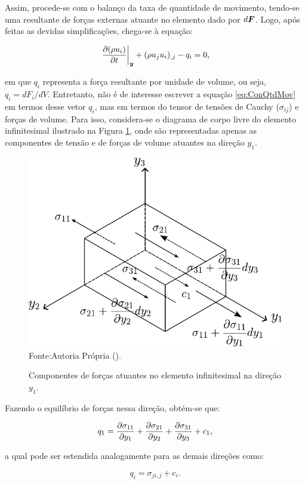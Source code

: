 Assim, procede-se com o balanço da taxa de quantidade de movimento, tendo-se uma resultante de forças externas atuante no elemento dado por $d\boldsymbol{F}$. Logo, após feitas as devidas simplificações, chega-se à equação:

\begin{equation}
    \left.\frac{\partial{(\rho u_i)}}{\partial{t}}\right|_{\boldsymbol{y}}+(\rho u_ju_i)_{,j}-q_i=0\text{,}
    \label{eq:ConQtdMov}
\end{equation}

\noindent em que $q_i$ representa a força resultante por unidade de volume, ou seja, $q_i=dF_i/dV$. Entretanto, não é de interesse escrever a equação \ref{eq:ConQtdMov} em termos desse vetor $q_i$, mas em termos do tensor de tensões de Cauchy ($\sigma_{ij}$) e forças de volume. Para isso, considera-se o diagrama de corpo livre do elemento infinitesimal ilustrado na Figura \ref{fig:EqFor}, onde são representadas apenas as componentes de tensão e de forças de volume atuantes na direção $y_1$.

\begin{figure}[h!]
    \centering
    \caption{Componentes de forças atuantes no elemento infinitesimal na direção $y_1$.}
    \includegraphics[width=.5\linewidth]{Figuras/EqFor.pdf}
    \\Fonte:Autoria Própria (\the\year).
    \label{fig:EqFor}
\end{figure}

Fazendo o equilíbrio de forças nessa direção, obtém-se que:

\begin{equation}
    q_1=\frac{\partial{\sigma_{11}}}{\partial{y_1}}+\frac{\partial{\sigma_{21}}}{\partial{y_2}}+\frac{\partial{\sigma_{31}}}{\partial{y_3}}+c_1\text{,}
\end{equation}

\noindent a qual pode ser estendida analogamente para as demais direções como:

\begin{equation}
    q_i=\sigma_{ji,j}+c_i\text{.}
    \label{eq:RelQSig}
\end{equation}

